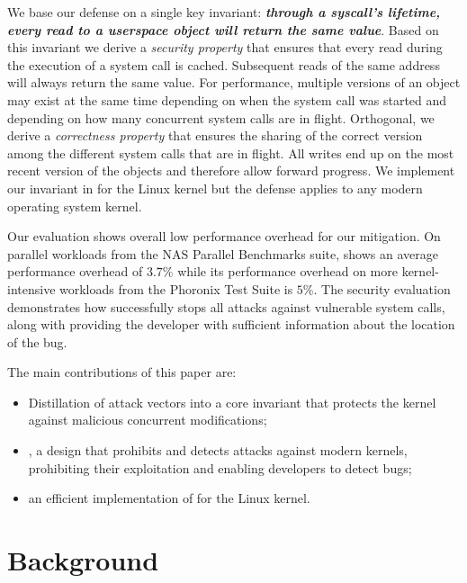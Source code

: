 \documentclass[letterpaper,twocolumn,10pt, anonymous]{article}
\begin{document}
We base our defense on a single key invariant: 
\textbf{\emph{through a syscall's lifetime, every read to a userspace object 
will return the same value}}. Based on this invariant we derive a \emph{security
property} that ensures that every read during the execution of a system call is
cached. Subsequent reads of the same address will always return the same value.
For performance, multiple versions of an object may exist at the same time
depending on when the system call was started and depending on how many
concurrent system calls are in flight. Orthogonal, we derive a \emph{correctness
property} that ensures the sharing of the correct version among the different
system calls that are in flight. All writes end up on the most recent version of
the objects and therefore allow forward progress.
We implement our invariant in \tiktok for the Linux kernel but the defense
applies to any modern operating system kernel.

Our evaluation shows overall low performance overhead for our mitigation.
On parallel workloads from the NAS Parallel Benchmarks suite, \tiktok shows 
an average performance overhead of $3.7\%$ while its performance overhead on
more kernel-intensive workloads from the Phoronix Test Suite is $5\%$.
The security evaluation demonstrates how \tiktok successfully stops all attacks
against vulnerable system calls, along with providing the developer with
sufficient information about the location of the bug.

The main contributions of this paper are:

\begin{itemize}[noitemsep]
\item Distillation of \tocttou attack vectors into a core invariant that protects
the kernel against malicious concurrent modifications;
\item \tiktok, a design that prohibits and detects
\tocttou attacks against modern kernels, prohibiting their exploitation and
enabling developers to detect \tocttou bugs;
\item an efficient implementation of \tiktok for the Linux kernel.
\end{itemize}


\section{Background}
\end{document}
